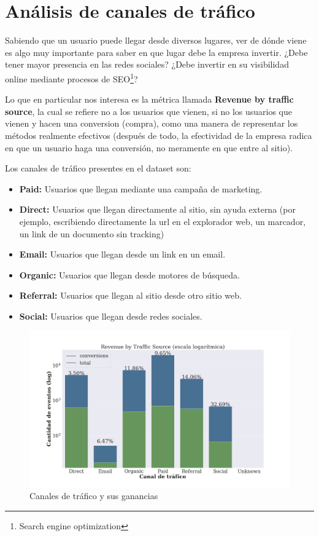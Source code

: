 \documentclass[a4paper]{article}
\begin{document}
\section{Análisis de canales de tráfico}

Sabiendo que un usuario puede llegar desde diversos lugares, ver de dónde viene es algo muy importante para saber en que lugar debe la empresa invertir. ¿Debe tener mayor presencia en las redes sociales? ¿Debe invertir en su visibilidad online mediante procesos de SEO\footnote{Search engine optimization}? 

Lo que en particular nos interesa es la métrica llamada \textbf{Revenue by traffic source}, la cual se refiere no a los usuarios que vienen, si no los usuarios que vienen y hacen una conversion (compra), como una manera de representar los métodos realmente efectivos (después de todo, la efectividad de la empresa radica en que un usuario haga una conversión, no meramente en que entre al sitio).

Los canales de tráfico presentes en el dataset son:
\begin{itemize}
\item \textbf{Paid: } Usuarios que llegan mediante una campaña de marketing.
\item \textbf{Direct: } Usuarios que llegan directamente al sitio, sin ayuda externa (por ejemplo, escribiendo directamente la url en el explorador web, un marcador, un link de un documento sin tracking)
\item \textbf{Email: } Usuarios que llegan desde un link en un email.
\item \textbf{Organic: } Usuarios que llegan desde motores de búsqueda.
\item \textbf{Referral: } Usuarios que llegan al sitio desde otro sitio web.
\item \textbf{Social: } Usuarios que llegan desde redes sociales.
\end{itemize}

\begin{figure}[h!]
	\includegraphics[width=\linewidth]{figures/180-revenue_traffic-boxplot.png}
	\caption{Canales de tráfico y sus ganancias}
	\label{fig:traffic}
\end{figure}
\end{document}
